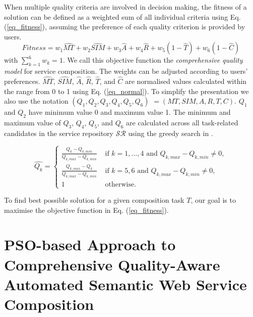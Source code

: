 When multiple quality criteria are involved in decision making, the fitness of a solution can be defined as a weighted sum of all individual criteria using Eq. (\ref{eq_fitness}), assuming the preference of each quality criterion is provided by users.
\begin{equation}
\label{eq_fitness}
Fitness = w_1 \hat{MT} + w_2 \hat{SIM} + w_3 \hat{A} + w_4 \hat{R} + w_5(1 - \hat{T}) + w_6(1 - \hat{C})
\end{equation}
\noindent with $\sum_{k=1}^{6} w_k= 1$. We call this objective function the \emph{comprehensive quality model} for service composition.
The weights can be adjusted according to users' preferences. $\hat{MT}$, $\hat{SIM}$, $\hat{A}$, $\hat{R}$, $\hat{T}$, and $\hat{C}$ are normalised values calculated within the range from 0 to 1 using Eq. (\ref{eq_normal}). To simplify the presentation we also use the notation $(Q_1,Q_2,Q_3,Q_4,Q_5,Q_6) $ $= (MT,SIM,A,R,T,C)$. $Q_1$ and $Q_2$ have minimum value 0 and maximum value 1. The minimum and maximum value of $Q_3$, $Q_4$, $Q_5$, and $Q_6$ are calculated across all task-related candidates in the service repository $\mathcal{SR}$ using the greedy search in \cite{ma2015hybrid,da2016genetic}.

\begin{equation}
\label{eq_normal}
\hat{Q_k} = 
\begin{cases}
	\frac{Q_k - Q_{k, min}}{Q_{k, max} - Q_{k, min}} & \text{ if $k=1,\ldots,4$ and }Q_{k, max} - Q_{k, min} \neq 0,\\
	\frac{Q_{k,max} - Q_k}{Q_{k, max} - Q_{k, min}} & \text{ if $k=5,6$ and }Q_{k, max} - Q_{k, min} \neq 0,\\
	1 & \text{ otherwise}.
\end{cases}
\end{equation}

\noindent To find best possible solution for a given composition task $T$, our goal is to maximise the objective function in Eq. (\ref{eq_fitness}).


\section{PSO-based Approach to Comprehensive Quality-Aware Automated Semantic Web Service Composition}\label{qswsc_approach}
